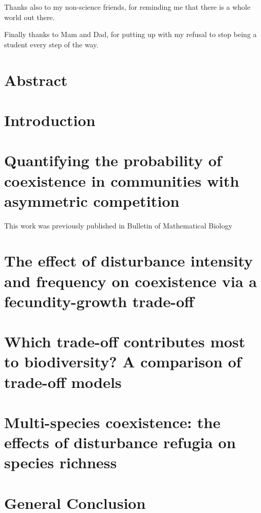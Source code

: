 \documentclass[a4paper]{report}
\begin{document}
Thanks also to my non-science friends, for reminding me that there is a whole world out there.

Finally thanks to Mam and Dad, for putting up with my refusal to stop being a student every step of the way. 

\chapter*{Abstract}


\tableofcontents
\listoffigures
\listoftables


    \setcounter{chapter}{-1}
\chapter{Introduction}


\newpage
\chapter{Quantifying the probability of coexistence in communities with asymmetric competition}
This work was previously published in Bulletin of Mathematical Biology \citep{nattrass2012quantifying}


\newpage
\chapter{The effect of disturbance intensity and frequency on coexistence via a fecundity-growth trade-off}


\newpage
\chapter{Which trade-off contributes most to biodiversity? A comparison of trade-off models}


\newpage
\chapter{Multi-species coexistence: the effects of disturbance refugia on species richness}



\newpage
\chapter{General Conclusion}


   \newpage



\pagebreak
\end{document}
